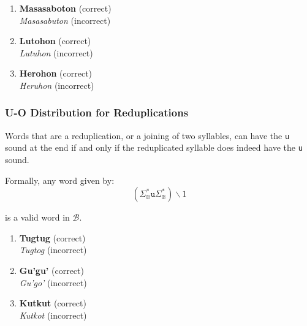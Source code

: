 \begin{enumerate}
      \item \textbf{Masasaboton} (correct) \\
            \textit{Masasabuton} (incorrect)
      \item \textbf{Lutohon} (correct) \\
            \textit{Lutuhon} (incorrect)
      \item \textbf{Herohon} (correct) \\
            \textit{Heruhon} (incorrect)
\end{enumerate}

\subsubsection{U-O Distribution for Reduplications}

Words that are a reduplication, or a joining of two syllables, can have the \texttt{u} sound at the end if and only if the reduplicated syllable does indeed have the \texttt{u} sound.

Formally, any word given by:
\[
      \left( \Sigma_\mathbb{B}^*\texttt{u}\Sigma_\mathbb{B}^* \right)\backslash1
\]

is a valid word in $\mathcal{B}$.

\begin{example}

\end{example}

\begin{enumerate}
      \item \textbf{Tugtug} (correct) \\
            \textit{Tugtog} (incorrect)
      \item \textbf{Gu'gu'} (correct)
            \\ \textit{Gu'go'} (incorrect)
      \item \textbf{Kutkut} (correct)
            \\ \textit{Kutkot} (incorrect)
\end{enumerate}



